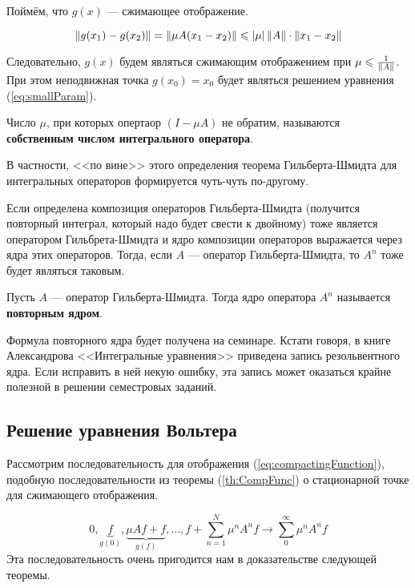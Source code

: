 \documentclass[12pt]{article}
\begin{document}
		Поймём, что $g(x)$ --- сжимающее отображение.
	
		$$\left\| g(x_1) - g(x_2) \right\| = \left\| \mu A(x_1 - x_2) \right\| \leqslant \left| \mu \right| \left\| A \right\| \cdot \left\| x_1 - x_2 \right\|$$
	
		Следовательно, $g(x)$ будем являться сжимающим отображением при $\mu \leqslant \frac{1}{\left\| A \right\|}$. При этом
		неподвижная точка $g(x_0) = x_0$ будет являться решением уравнения (\ref{eq:smallParam}).
	
		\begin{defi}
			Число $\mu$, при которых опертаор $(I - \mu A)$ не обратим, называются \textbf{собственным числом
			интегрального оператора}.
		\end{defi}
	
		В частности, <<по вине>> этого определения теорема Гильберта-Шмидта для интегральных операторов формируется
		чуть-чуть по-другому.
	
		Если определена композиция операторов Гильберта-Шмидта (получится повторный интеграл, который надо будет 
		свести к двойному) тоже является оператором Гильбрета-Шмидта и ядро композиции операторов выражается 
		через ядра этих операторов. Тогда, если $A$ --- оператор Гильберта-Шмидта, то $A^n$ тоже будет являться
		таковым.
	
		\begin{defi}
			Пусть $A$ --- оператор Гильберта-Шмидта. Тогда ядро оператора $A^n$ называется \textbf{повторным ядром}.
		\end{defi}
	
		{\footnotesize
		Формула повторного ядра будет получена на семинаре. Кстати говоря, в книге Александрова <<Интегральные уравнения>>
		приведена запись резольвентного ядра. Если исправить в ней некую ошибку, эта запись может оказаться крайне полезной
		в решении семестровых заданий.\par
		}

	\subsection{Решение уравнения Вольтера}

		Рассмотрим последовательность для отображения (\ref{eq:compactingFunction}), подобную последовательности
		из теоремы (\ref{th:CompFunc}) о стационарной точке для сжимающего отображения.
	
		$$0, \underbrace{f}_{g(0)}, \underbrace{\mu Af + f}_{g(f)}, \ldots, f + \sum_{n=1}^N \mu^nA^nf \rightarrow \sum_0^{\infty} \mu^nA^n f$$
		Эта последовательность очень пригодится нам в доказательстве следующей теоремы.	
	
\end{document}
